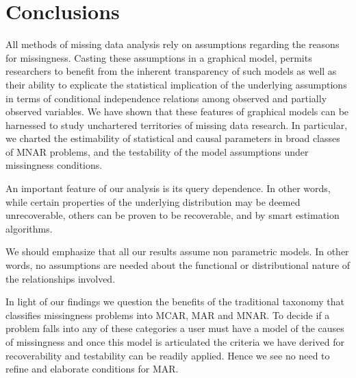 \documentclass[12pt]{article}
\begin{document}

\section{Conclusions}
All methods of missing data analysis rely on
assumptions regarding the reasons for missingness.
Casting these assumptions in a graphical model, permits
researchers to benefit from the inherent
transparency of such models as well as their ability to
explicate the statistical implication of the underlying
assumptions in terms of conditional independence relations
among observed and partially observed variables.
We have shown that these features of graphical models
can be harnessed to study unchartered territories of
missing data research.  In particular, we charted the
estimability of statistical and causal
parameters in broad classes of MNAR problems, and the
testability of the model assumptions under missingness
conditions.

An important feature of our analysis is its query
dependence. In other words, while certain properties of
the underlying distribution may be deemed unrecoverable,
others can be proven to be recoverable, and by smart
estimation algorithms.

We should emphasize that all our results assume
non parametric models. In other words, no assumptions
are needed about the functional or distributional nature
of the relationships involved.

In light of our findings we question the benefits of the traditional taxonomy that
classifies missingness problems into MCAR, MAR and MNAR. To decide if a problem falls into any
of these categories a user must have a model of the causes of missingness and once this model is articulated 
the criteria we have derived for recoverability and testability can be readily applied. Hence we see no need to 
refine and elaborate conditions for MAR. 
\end{document}
